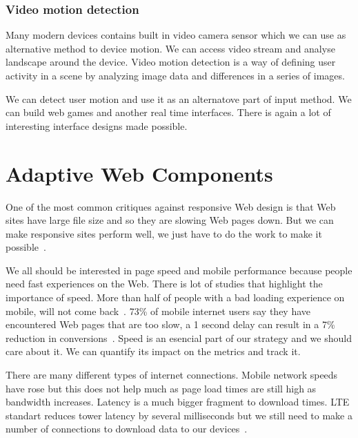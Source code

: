 \documentclass{iitsrc}
\begin{document}

\subsubsection*{Video motion detection} %
\label{sub:video_motion}

Many modern devices contains built in video camera sensor which we can use as alternative method to device motion. We can access video stream and analyse landscape around the device. Video motion detection is a way of defining user activity in a scene by analyzing image data and differences in a series of images.

We can detect user motion and use it as an alternatove part of input method. We can build web games and another real time interfaces. There is again a lot of interesting interface designs made possible.


\section{Adaptive Web Components} %
\label{sec:adaptive_web_components}

One of the most common critiques against responsive Web design is that Web sites have large file size and so they are slowing Web pages down. But we can make responsive sites perform well, we just have to do the work to make it possible~\cite{20mb}.

We all should be interested in page speed and mobile performance because people need fast experiences on the Web. There is lot of studies that highlight the importance of speed. More than half of people with a bad loading experience on mobile, will not come back~\cite{performancebrowsernetworking}. 73\% of mobile internet users say they have encountered Web pages that are too slow, a 1 second delay can result in a 7\% reduction in conversions~\cite{pagespeed}. Speed is an esencial part of our strategy and we should care about it. We can quantify its impact on the metrics and track it.

There are many different types of internet connections. Mobile network speeds have rose but this does not help much as page load times are still high as bandwidth increases. Latency is a much bigger fragment to download times. LTE standart reduces tower latency by several milliseconds but we still need to make a number of connections to download data to our devices~\cite{performancebrowsernetworking}.
\end{document}
